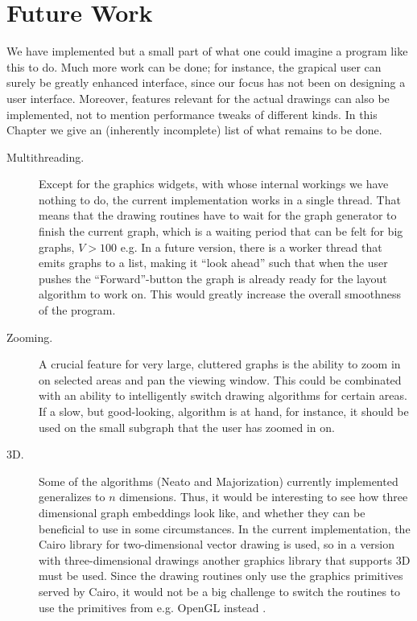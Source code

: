 
\chapter{Future Work}

We have implemented but a small part of what one could imagine a program like
this to do. Much more work can be done; for instance, the grapical user can
surely be greatly enhanced interface, since our focus has not been on
designing a user interface. Moreover, features relevant for the actual
drawings can also be implemented, not to mention performance tweaks of
different kinds. In this Chapter we give an (inherently incomplete) list of
what remains to be done.

\begin{description}
	\item[Multithreading.] Except for the graphics widgets, with whose internal workings 
	we have
	nothing to do, the current implementation works in a single thread. That means
	that the drawing routines have to wait for the graph generator to finish the
	current graph, which is a waiting period that can be felt for big graphs, $V>100$ e.g.
	In a future version, there is a worker thread that emits graphs to a list, making 
	it ``look ahead'' such that when the user pushes the ``Forward''-button the graph
	is already ready for the layout algorithm to work on. This would greatly increase
	the overall smoothness of the program. 
	
	\item[Zooming.] A crucial feature for very large, cluttered graphs is the
	ability to zoom in on selected areas and pan the viewing window. This could be combinated
	with an ability to intelligently switch drawing algorithms for certain areas. 
	If a slow, but good-looking, algorithm is at hand, for instance, it should be used
	on the small subgraph that the user has zoomed in on. 
	
	\item[3D.] Some of the algorithms (Neato and Majorization) currently implemented generalizes to 
	$n$ dimensions. Thus, it would be interesting to see how three dimensional 
	graph embeddings look like, and whether they can be beneficial to use in some
	circumstances. In the current implementation, the Cairo library for two-dimensional
	vector drawing is used, so in a version with three-dimensional drawings another
	graphics library that supports 3D must be used. Since the drawing routines 
	only use the graphics primitives served by Cairo, it would not be a big challenge
	to switch the routines to use the primitives from e.g. OpenGL instead \cite{OpenGL}.
	

\end{description}

